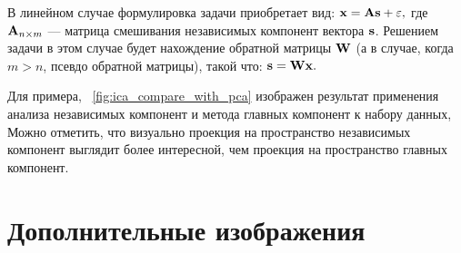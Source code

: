 В линейном случае формулировка задачи приобретает вид: $\mathrm{\mathbf{x}} = \mathrm{\mathbf{A}} \mathrm{\mathbf{s}} + \varepsilon,$ где $\mathrm{\mathbf{A}}_{n \times m}$ --- матрица смешивания независимых компонент вектора $\mathrm{\mathbf{s}}$. Решением задачи в этом случае будет нахождение обратной матрицы $\mathrm{\mathbf{W}}$ (а в случае, когда $m > n$, псевдо обратной матрицы), такой что: $\mathrm{\mathbf{s}} = \mathrm{\mathbf{W}} \mathrm{\mathbf{x}}.$


Для примера, \onfigure~\ref{fig:ica_compare_with_pca} изображен результат применения анализа независимых компонент и метода главных компонент к набору данных,  Можно отметить, что визуально проекция на пространство независимых компонент выглядит более интересной, чем проекция на пространство главных компонент.



\chapter{Дополнительные изображения} \label{appendix:figures}

